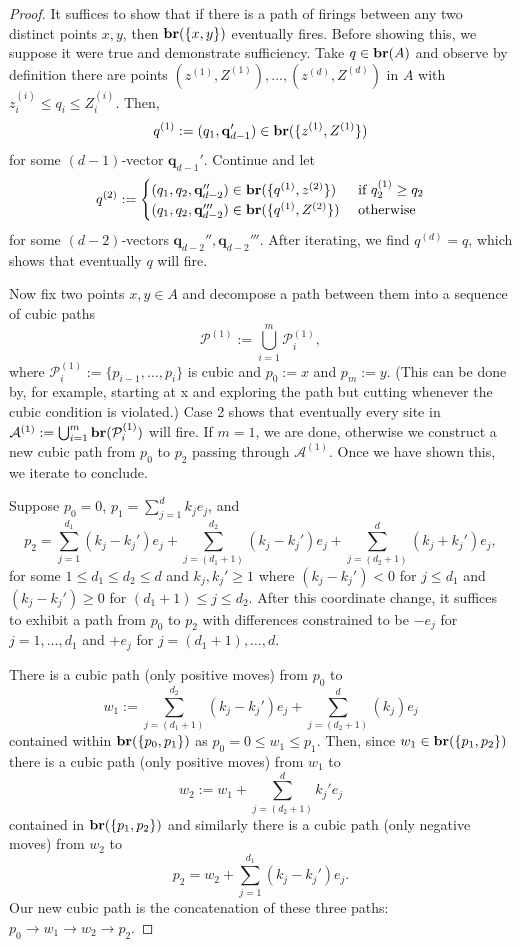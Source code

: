 \documentclass[12pt]{amsart}
\begin{document}
\begin{proof}
	It suffices to show that if there is a path of firings between any two distinct points $x,y$, 
	then $\mathbf{br}(\{x,y\})$ eventually fires. Before showing this, we suppose it were true and demonstrate sufficiency.
	Take $q \in \mathbf{br}(A)$ and observe by definition there are points $(z^{(1)}, Z^{(1)}), \ldots, (z^{(d)}, Z^{(d)})$ in $A$
	with $z_i^{(i)} \leq q_i \leq Z_i^{(i)}$.  Then,
	\[
	q^{(1)} := (q_1, \mathbf{q}_{d-1}') \in \mathbf{br}(\{z^{(1)}, Z^{(1)}\})
	\]
	for some $(d-1)$-vector $\mathbf{q}_{d-1}'$. Continue and let 
	\[
	q^{(2)} := \begin{cases}
	(q_1, q_2, \mathbf{q}_{d-2}'')  \in \mathbf{br}(\{q^{(1)}, z^{(2)}\}) &\mbox{ if $q^{(1)}_2 \geq q_2$}\\
	(q_1,q_2, \mathbf{q}_{d-2}''')  \in \mathbf{br}(\{q^{(1)}, Z^{(2)}\}) &\mbox{ otherwise }\\
	\end{cases}	
	\]
	for some $(d-2)$-vectors $\mathbf{q}_{d-2}'', \mathbf{q}_{d-2}'''$. After iterating, we find $q^{(d)} = q$, which shows that eventually $q$ will fire.
	
	
	Now fix two points $x,y \in A$ and decompose
	a path between them into a sequence of cubic paths
	\[
	\mathcal{P}^{(1)} := \bigcup_{i=1}^m \mathcal{P}^{(1)}_i, 
	\]
	where $\mathcal{P}^{(1)}_i := \{p_{i-1}, \ldots, p_i \}$ is cubic and $p_0 := x$ and $p_{m} := y$. (This can be done by, for example, 
	starting at x and exploring the path but cutting whenever the cubic condition is violated.) Case 2 shows that eventually every site in $\mathcal{A}^{(1)} := \bigcup_{i=1}^m \mathbf{br}(\mathcal{P}^{(1)}_i)$ will fire. 
	If $m = 1$, we are done, otherwise we construct a new cubic path from $p_0$ to $p_2$ 
	passing through $\mathcal{A}^{(1)}$. Once we have shown this, we
	iterate to conclude. 
	
	
	Suppose $p_0 = 0$, $p_{1} = \sum_{j=1}^d k_j e_j$, and 
	\[
	p_{2} = \sum_{j=1}^{d_1} (k_j-k_j') e_j  + \sum_{j=(d_1+1)}^{d_2} (k_j - k_j') e_j + \sum_{j=(d_2+1)}^{d} (k_j+k_j') e_j,
	\]
	for some $1 \leq d_1 \leq d_2 \leq d$ and $k_j,k_j' \geq 1$ where $(k_j - k_j') < 0$ for $j \leq d_1$ and $(k_j - k_j') \geq 0$
	for $(d_1 + 1) \leq j \leq d_2$. After this coordinate change, it suffices to exhibit a path from $p_0$ to $p_2$ with differences constrained to be $-e_j$ for $j = 1, \ldots, d_1$ and 
	$+e_j$ for $j = (d_1 + 1), \ldots, d$.
	
	There is a cubic path (only positive moves) from $p_0$ to
	\[
	w_1 := \sum_{j=(d_1+1)}^{d_2} (k_j - k_j') e_j + \sum_{j=(d_2+1)}^{d} (k_j) e_j
	\]
	contained within $\mathbf{br}(\{p_0, p_1\})$ as $p_0 = 0 \leq w_1 \leq p_1$. Then, since $w_1 \in \mathbf{br}(\{p_1,p_2\})$ there is a cubic path (only positive moves) from $w_1$ to 
	\[
	w_2 := w_1 + \sum_{j=(d_2+1)}^{d} k_j'e_j
	\]
	contained in $\mathbf{br}(\{p_1, p_2\})$ and similarly there is a cubic path (only negative moves) from $w_2$ to 
	\[
	p_2 = w_2  + \sum_{j=1}^{d_1} (k_j-k_j') e_j.
	\]
	Our new cubic path is the concatenation of these three paths: $p_0 \to w_1  \to w_2 \to p_2$. 
\end{proof}
\end{document}

